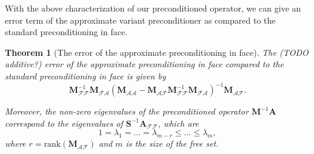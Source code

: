 \documentclass[11pt]{article}
\theoremstyle{plain}
\newtheorem{theorem}{Theorem}[section]
\theoremstyle{definition}
\newcommand{\MA}{\bm{A}}
\newcommand{\MM}{\bm{M}}
\newcommand{\MS}{\bm{S}}
\begin{document}
With the above characterization of our preconditioned operator, we can give an error term of the approximate variant preconditioner as compared to the standard preconditioning in face.
\begin{theorem}[The error of the approximate preconditioning in face]
  \label{theo:eigvals}
  The (TODO additive?) error of the approximate preconditioning in face compared to the standard preconditioning in face is given by
\begin{equation*}
  \MM_{\mathcal{F}\mathcal{F}}^{-1} \MM_{\mathcal{F}\mathcal{A}} ( \MM_{\mathcal{A}\mathcal{A}} - \MM_{\mathcal{A}\mathcal{F}} \MM_{\mathcal{F}\mathcal{F}}^{-1} \MM_{\mathcal{F}\mathcal{A}})^{-1} \MM_{\mathcal{A}\mathcal{F}}.
\end{equation*}

Moreover, the non-zero eigenvalues of the preconditioned operator $\MM^{-1}\MA$ correspond to the eigenvalues of $\MS^{-1}\MA_{\mathcal{FF}}$, which are
\begin{equation*}
  1 = \lambda_1 = \dots = \lambda_{m-r} \le \dots \le \lambda_m,
\end{equation*}
where $r=\text{rank}(\MM_{\mathcal{AF}})$ and $m$ is the size of the free set.
\end{theorem}
\end{document}
